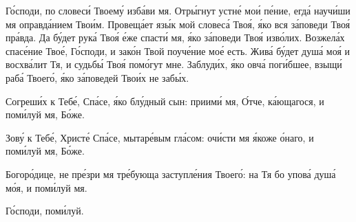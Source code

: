 \begin{mymulticols}
Г\'{о}споди, по словес\'{и} Твоем\'{у} изб\'{а}ви мя. Отр\'{ы}гнут устн\'{е} мо\'{и} п\'{е}ние, егд\'{а} науч\'{и}ши мя оправд\'{а}нием Тво\'{и}м. Провещ\'{а}ет яз\'{ы}к мой словес\'{а} Тво\'{я}, \'{я}ко вся з\'{а}поведи Тво\'{я} пр\'{а}вда. Да б\'{у}дет рук\'{а} Тво\'{я} \'{е}же спаст\'{и} мя, \'{я}ко з\'{а}поведи Тво\'{я} изв\'{о}лих. Возжел\'{а}х спас\'{е}ние Тво\'{е}, Г\'{о}споди, и зак\'{о}н Твой поуч\'{е}ние мо\'{е} есть. Жив\'{а} б\'{у}дет душ\'{а} мо\'{я} и восхв\'{а}лит Тя, и судьб\'{ы} Тво\'{я} пом\'{о}гут мне. Заблуд\'{и}х, \'{я}ко овч\'{а} пог\'{и}бшее, взыщ\'{и} раб\'{а} Твоег\'{о}, \'{я}ко з\'{а}поведей Тво\'{и}х не заб\'{ы}х.

\pominalnayaslava


\TrisviatoePoOtcheNash


Согреш\'{и}х к Теб\'{е}, Сп\'{а}се, \'{я}ко бл\'{у}дный сын: приим\'{и} мя, \'{О}тче, к\'{а}ющагося, и пом\'{и}луй мя, Б\'{о}же. 

\slavan

Зов\'{у} к Теб\'{е}, Христ\'{е} Сп\'{а}се, мытар\'{е}вым гл\'{а}сом: оч\'{и}сти мя \'{я}коже \'{о}наго, и пом\'{и}луй мя, Б\'{о}же. 

\inynen

Богор\'{о}дице, не пр\'{е}зри мя тр\'{е}бующа заступл\'{е}ния Твоег\'{о}: на Тя бо упов\'{а} душ\'{а} м\'{о}я, и пом\'{и}луй мя. 

Г\'{о}споди, пом\'{и}луй. 




\end{mymulticols}
